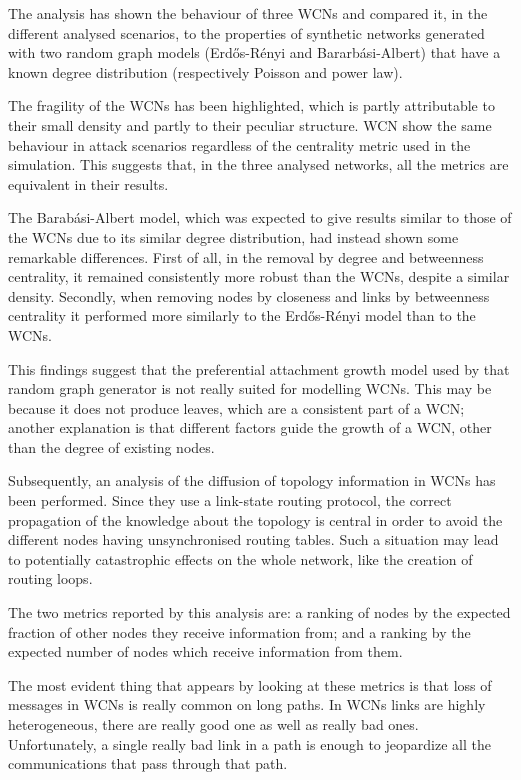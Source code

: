 \documentclass[a4paper,11pt,twoside,openleft]{memoir}
\begin{document}
The analysis has shown the behaviour of three WCNs and compared it, in the
different analysed scenarios, to the properties of synthetic networks
generated with two random graph models (Erd\H{o}s-Rényi and Bararbási-Albert)
that have a known degree distribution (respectively Poisson and power law).

The fragility of the WCNs has been highlighted, which is partly attributable
to their small density and partly to their peculiar structure. WCN show the
same behaviour in attack scenarios regardless of the centrality metric used
in the simulation. This suggests that, in the three analysed
networks, all the metrics are equivalent in their results.

The Barabási-Albert model, which was expected to give results similar to
those of the WCNs due to its similar degree distribution, had instead shown
some remarkable differences. First of all, in the removal by degree and
betweenness centrality, it remained consistently more robust than the WCNs,
despite a similar density. Secondly, when removing nodes by closeness and
links by betweenness centrality it performed more similarly to the
Erd\H{o}s-Rényi model than to the WCNs.

This findings suggest that the preferential attachment growth model used by
that random graph generator is not really suited for modelling WCNs.
This may be because it does not produce leaves, which are a consistent part
of a WCN; another explanation is that different factors guide the growth of
a WCN, other than the degree of existing nodes.

Subsequently, an analysis of the diffusion of topology information in WCNs
has been performed. Since they use a link-state routing protocol, the correct
propagation of the knowledge about the topology is central in order to avoid
the different nodes having unsynchronised routing tables. Such a situation
may lead to potentially catastrophic effects on the whole network, like the
creation of routing loops.

The two metrics reported by this analysis are: a ranking of nodes by the expected
fraction of other nodes they receive information from; and a ranking by the
expected number of nodes which receive information from them.

The most evident thing that appears by looking at these metrics is that loss
of messages in WCNs is really common on long paths. In WCNs links are highly
heterogeneous, there are really good one as well as really bad ones.
Unfortunately, a single really bad link in a path is enough to jeopardize
all the communications that pass through that path.
\end{document}
